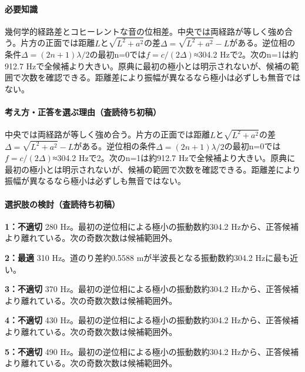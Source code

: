 \paragraph{必要知識} 幾何学的経路差とコヒーレントな音の位相差。中央では両経路が等しく強め合う。片方の正面では距離\(L\)と\(\sqrt{L^2+a^2}\)の差\(\Delta=\sqrt{L^2+a^2}-L\)がある。逆位相の条件\(\Delta=(2n+1)\lambda/2\)の最初n=\allowbreak{}0では\(f=c/(2\Delta)\)≈304.2 Hzで2。次のn=\allowbreak{}1は約912.7 Hzで全候補より大きい。原典に最初の極小とは明示されないが、候補の範囲で次数を確認できる。距離差により振幅が異なるなら極小は必ずしも無音ではない。

\paragraph{考え方・正答を選ぶ理由（査読待ち初稿）} 中央では両経路が等しく強め合う。片方の正面では距離\(L\)と\(\sqrt{L^2+a^2}\)の差\(\Delta=\sqrt{L^2+a^2}-L\)がある。逆位相の条件\(\Delta=(2n+1)\lambda/2\)の最初n=\allowbreak{}0では\(f=c/(2\Delta)\)≈304.2 Hzで2。次のn=\allowbreak{}1は約912.7 Hzで全候補より大きい。原典に最初の極小とは明示されないが、候補の範囲で次数を確認できる。距離差により振幅が異なるなら極小は必ずしも無音ではない。

\paragraph{選択肢の検討（査読待ち初稿）}\mbox{}\par

\noindent\textbf{1：不適切} 280 Hz。最初の逆位相による極小の振動数約304.2 Hzから、正答候補より離れている。次の奇数次数は候補範囲外。\par

\noindent\textbf{2：最適} 310 Hz。道のり差約0.5588 mが半波長となる振動数約304.2 Hzに最も近い。\par

\noindent\textbf{3：不適切} 370 Hz。最初の逆位相による極小の振動数約304.2 Hzから、正答候補より離れている。次の奇数次数は候補範囲外。\par

\noindent\textbf{4：不適切} 430 Hz。最初の逆位相による極小の振動数約304.2 Hzから、正答候補より離れている。次の奇数次数は候補範囲外。\par

\noindent\textbf{5：不適切} 490 Hz。最初の逆位相による極小の振動数約304.2 Hzから、正答候補より離れている。次の奇数次数は候補範囲外。\par

